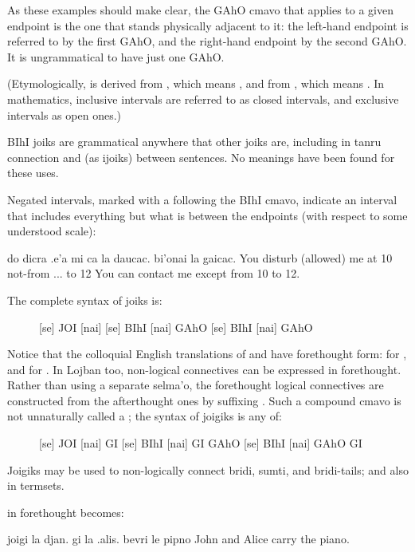 As these examples should make clear, the GAhO cmavo that
    applies to a given endpoint is the one that stands physically
    adjacent to it: the left-hand endpoint is referred to by the
    first GAhO, and the right-hand endpoint by the second GAhO. It
    is ungrammatical to have just one GAhO. 

(Etymologically,  is derived from , which
    means , and  from , which means
    . In mathematics, inclusive intervals are referred to
    as closed intervals, and exclusive intervals as open ones.)

BIhI joiks are grammatical anywhere that other joiks are,
    including in tanru connection and (as ijoiks) between
    sentences. No meanings have been found for these uses.

Negated intervals, marked with a  following the BIhI
    cmavo, indicate an interval that includes everything but what
    is between the endpoints (with respect to some understood
    scale):
\begin{example}
do dicra .e'a mi ca la daucac. bi'onai la gaicac.\n
You disturb (allowed) me at 10 not-from ... to 12\n
You can contact me except from 10 to 12.
\end{example}

The complete syntax of joiks is:
\begin{description}
\item[] [se] JOI [nai] [se] BIhI [nai] GAhO [se] BIhI [nai] GAhO
\end{description}

Notice that the colloquial English translations of  and
     have forethought form:  for
    , and  for . In Lojban too,
    non-logical connectives can be expressed in forethought. Rather
    than using a separate selma'o, the forethought logical
    connectives are constructed from the afterthought ones by
    suffixing . Such a compound cmavo is not unnaturally
    called a ; the syntax of joigiks is any of: 
\begin{description}
\item[] [se] JOI [nai] GI [se] BIhI [nai] GI GAhO [se] BIhI [nai] GAhO GI
\end{description}

Joigiks may be used to non-logically connect bridi, sumti, and
    bridi-tails; and also in termsets. 

 in forethought
    becomes:
\begin{example}
joigi la djan. gi la .alis. bevri le pipno\n
{} John and Alice carry the piano.
\end{example}

